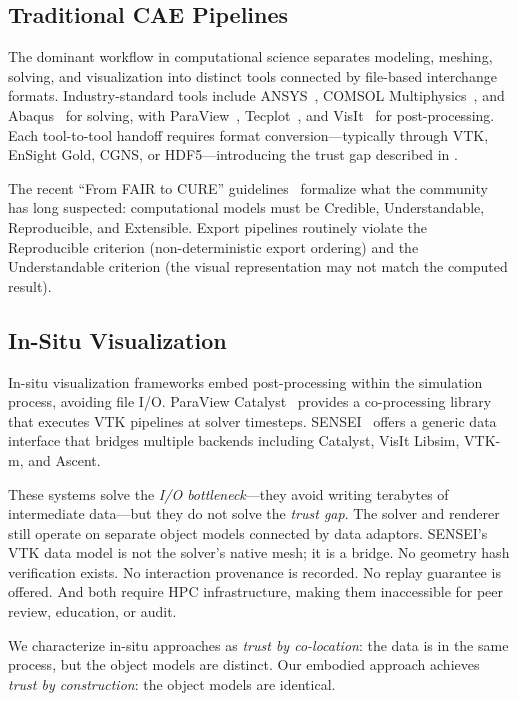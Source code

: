 \documentclass[journal]{IEEEtran}
\begin{document}
\subsection{Traditional CAE Pipelines}
\label{sec:related:traditional}

The dominant workflow in computational science separates modeling, meshing,
solving, and visualization into distinct tools connected by file-based
interchange formats. Industry-standard tools include ANSYS~\cite{ANSYS2024},
COMSOL Multiphysics~\cite{COMSOL2024}, and Abaqus~\cite{Abaqus2024} for
solving, with ParaView~\cite{ParaView2024book}, Tecplot~\cite{Tecplot2024},
and VisIt~\cite{VisIt2012} for post-processing. Each tool-to-tool handoff
requires format conversion---typically through VTK, EnSight Gold, CGNS, or
HDF5---introducing the trust gap described in .

The recent ``From FAIR to CURE'' guidelines~\cite{CURE2026} formalize what
the community has long suspected: computational models must be Credible,
Understandable, Reproducible, and Extensible. Export pipelines routinely
violate the Reproducible criterion (non-deterministic export ordering) and
the Understandable criterion (the visual representation may not match the
computed result).


\subsection{In-Situ Visualization}
\label{sec:related:insitu}

In-situ visualization frameworks embed post-processing within the simulation
process, avoiding file I/O. ParaView Catalyst~\cite{Catalyst2016} provides
a co-processing library that executes VTK pipelines at solver timesteps.
SENSEI~\cite{SENSEI2017} offers a generic data interface that bridges
multiple backends including Catalyst, VisIt Libsim, VTK-m, and Ascent.

These systems solve the \emph{I/O bottleneck}---they avoid writing terabytes
of intermediate data---but they do not solve the \emph{trust gap}. The solver
and renderer still operate on separate object models connected by data
adaptors. SENSEI's VTK data model is not the solver's native mesh; it is a
bridge. No geometry hash verification exists. No interaction provenance is
recorded. No replay guarantee is offered. And both require HPC
infrastructure, making them inaccessible for peer review, education, or
audit.

We characterize in-situ approaches as \emph{trust by co-location}: the data
is in the same process, but the object models are distinct. Our embodied
approach achieves \emph{trust by construction}: the object models are
identical.
\end{document}
